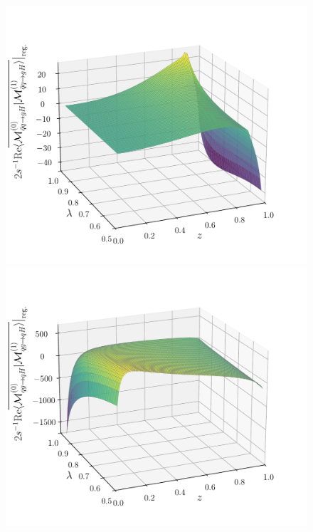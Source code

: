 \begin{figure}[ht]
\begin{minipage}[t]{0.49\textwidth}
  \includegraphics[width=\textwidth]{Images/RV_amplitudes/tOSbOS_qBq.pdf}
  \end{minipage}
  \begin{minipage}[t]{0.49\textwidth}
  \centering
  \includegraphics[width=\textwidth]{Images/RV_amplitudes/tOSbOS_qg.pdf}
  \end{minipage}
  \begin{minipage}[t]{0.49\textwidth}

\end{minipage}
\end{figure}
